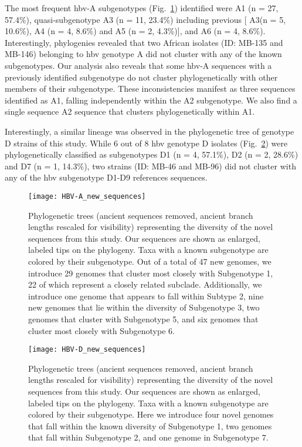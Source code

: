 The most frequent \gls{hbv}-A subgenotypes (Fig.~\ref{fig:HBV-A_new_sequences}) identified were A1 (n = 27, 57.4\%), quasi-subgenotype A3 (n = 11, 23.4\%) including previous [ A3(n = 5, 10.6\%), A4 (n = 4, 8.6\%) and A5 (n = 2, 4.3\%)], and A6 (n = 4, 8.6\%).
Interestingly, phylogenies revealed that two African isolates (ID: MB-135 and MB-146) belonging to \gls{hbv} genotype A did not cluster with any of the known subgenotypes.
Our analysis also reveals that some \gls{hbv}-A sequences with a previously identified subgenotype do not cluster phylogenetically with other members of their subgenotype.
These inconsistencies manifest as three sequences identified as A1, falling independently within the A2 subgenotype.
We also find a single sequence A2 sequence that clusters phylogenetically within A1.

Interestingly, a similar lineage was observed in the phylogenetic tree of genotype D strains of this study.
While 6 out of 8 \gls{hbv} genotype D isolates (Fig.~\ref{fig:HBV-D_new_sequences}) were phylogenetically classified as subgenotypes D1 (n = 4, 57.1\%), D2 (n = 2, 28.6\%) and D7 (n = 1, 14.3\%), two strains (ID: MB-46 and MB-96) did not cluster with any of the \gls{hbv} subgenotype D1-D9 references sequences.


\begin{figure}[ht]
  \centering
  \medskip
  \texttt{[image: HBV-A\_new\_sequences]}
  \caption[HBV-A New sequences]{Phylogenetic trees (ancient sequences removed, ancient branch lengths rescaled for visibility) representing the diversity of the novel sequences from this study. Our sequences are shown as enlarged, labeled tips on the phylogeny. Taxa with a known subgenotype are colored by their subgenotype. Out of a total of 47 new genomes, we introduce 29 genomes that cluster most closely with Subgenotype 1, 22 of which represent a closely related subclade. Additionally, we introduce one genome that appears to fall within Subtype 2, nine new genomes that lie within the diversity of Subgenotype 3, two genomes that cluster with Subgenotype 5, and six genomes that cluster most closely with Subgenotype 6.}
  \label{fig:HBV-A_new_sequences}
\end{figure}

\begin{figure}[ht]
  \centering
  \medskip
  \texttt{[image: HBV-D\_new\_sequences]}
  \caption[HBV-D New sequences]{Phylogenetic trees (ancient sequences removed, ancient branch lengths rescaled for visibility) representing the diversity of the novel sequences from this study. Our sequences are shown as enlarged, labeled tips on the phylogeny. Taxa with a known subgenotype are colored by their subgenotype. Here we introduce four novel genomes that fall within the known diversity of Subgenotype 1, two genomes that fall within Subgenotype 2, and one genome in Subgenotype 7.}
  \label{fig:HBV-D_new_sequences}
\end{figure}

